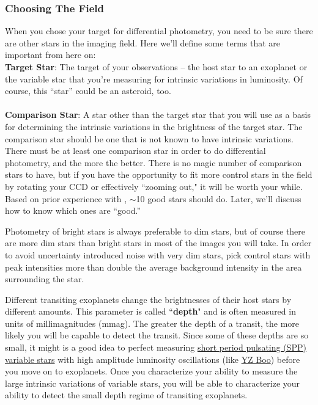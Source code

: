 \documentclass{article}
\begin{document}
\subsubsection{Choosing The Field}
When you chose your target for differential photometry, you need to be sure there are other stars in the imaging field. Here we'll define some terms that are important from here on:  \\ 

\noindent \textbf{Target Star}: The target of your observations -- the host star to an exoplanet or the variable star that you're measuring for intrinsic variations in luminosity. Of course, this ``star'' could be an asteroid, too. \\\\
\textbf{Comparison Star}: A star other than the target star that you will use as a basis for determining the intrinsic variations in the brightness of the target star. The comparison star should be one that is not known to have intrinsic variations. \\

There must be at least one comparison star in order to do differential photometry, and the more the better. There is no magic number of comparison stars to have, but if you have the opportunity to fit more control stars in the field by rotating your CCD or effectively ``zooming out," it will be worth your while. Based on prior experience with \oscaar, $ \sim $10 good stars should do. Later, we'll discuss how to know which ones are ``good.''

Photometry of bright stars is always preferable to dim stars, but of course there are more dim stars than bright stars in most of the images you will take. In order to avoid uncertainty introduced noise with very dim stars, pick control stars with peak intensities more than double the average background intensity in the area surrounding the star. 

Different transiting exoplanets change the brightnesses of their host stars by different amounts. This parameter is called ``\textbf{depth}" and is often measured in units of millimagnitudes (mmag). The greater the depth of a transit, the more likely you will be capable to detect the transit. Since some of these depths are so small, it might is a good idea to perfect measuring \href{https://sites.google.com/site/aavsosppsection/}{short period pulsating (SPP) variable stars} with high amplitude luminosity oscillations (like \href{http://www.aavso.org/vsx/index.php?view=detail.top&oid=4356}{YZ Boo}) before you move on to exoplanets. Once you characterize your ability to measure the large intrinsic variations of variable stars, you will be able to characterize your ability to detect the small depth regime of transiting exoplanets. 
\end{document}
